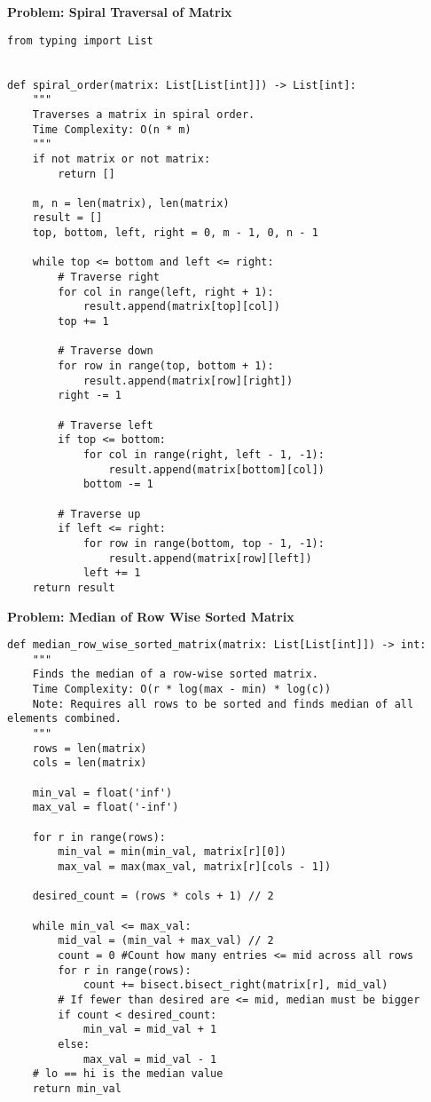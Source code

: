 \noindent\textbf{Problem: Spiral Traversal of Matrix}
\begin{verbatim}
from typing import List


def spiral_order(matrix: List[List[int]]) -> List[int]:
    """
    Traverses a matrix in spiral order.
    Time Complexity: O(n * m)
    """
    if not matrix or not matrix:
        return []

    m, n = len(matrix), len(matrix)
    result = []
    top, bottom, left, right = 0, m - 1, 0, n - 1

    while top <= bottom and left <= right:
        # Traverse right
        for col in range(left, right + 1):
            result.append(matrix[top][col])
        top += 1

        # Traverse down
        for row in range(top, bottom + 1):
            result.append(matrix[row][right])
        right -= 1

        # Traverse left
        if top <= bottom:
            for col in range(right, left - 1, -1):
                result.append(matrix[bottom][col])
            bottom -= 1

        # Traverse up
        if left <= right:
            for row in range(bottom, top - 1, -1):
                result.append(matrix[row][left])
            left += 1
    return result
\end{verbatim}

\noindent\textbf{Problem: Median of Row Wise Sorted Matrix}
\begin{verbatim}
def median_row_wise_sorted_matrix(matrix: List[List[int]]) -> int:
    """
    Finds the median of a row-wise sorted matrix.
    Time Complexity: O(r * log(max - min) * log(c))
    Note: Requires all rows to be sorted and finds median of all elements combined.
    """
    rows = len(matrix)
    cols = len(matrix)

    min_val = float('inf')
    max_val = float('-inf')

    for r in range(rows):
        min_val = min(min_val, matrix[r][0])
        max_val = max(max_val, matrix[r][cols - 1])

    desired_count = (rows * cols + 1) // 2

    while min_val <= max_val:
        mid_val = (min_val + max_val) // 2
        count = 0 #Count how many entries <= mid across all rows
        for r in range(rows):
            count += bisect.bisect_right(matrix[r], mid_val)
        # If fewer than desired are <= mid, median must be bigger
        if count < desired_count:
            min_val = mid_val + 1
        else:
            max_val = mid_val - 1
    # lo == hi is the median value
    return min_val
\end{verbatim}

